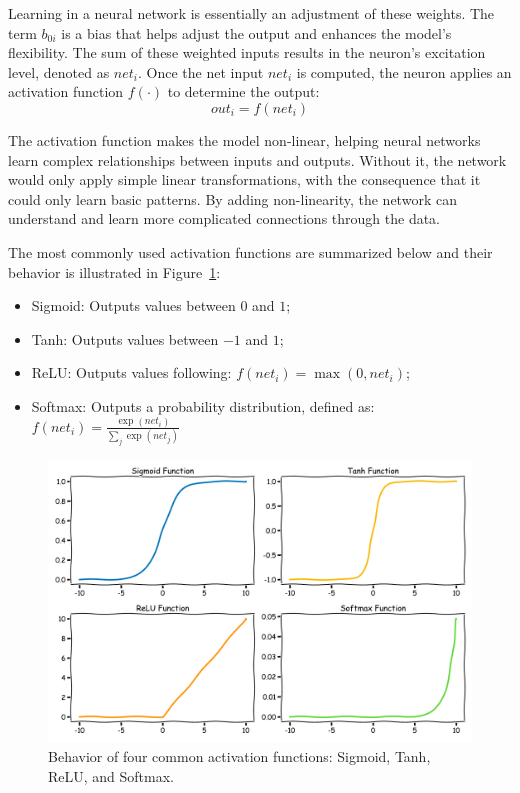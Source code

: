 Learning in a neural network is essentially an adjustment of these weights. The term $b_{0i}$ is a bias that helps adjust the output and enhances the model's flexibility. The sum of these weighted inputs results in the neuron’s excitation level, denoted as $\textit{net}_i$.
Once the net input ${net}_i$ is computed, the neuron applies an activation function $f(\cdot)$ to determine the output:
\begin{equation}
    \textit{out}_i = f(\textit{net}_i)
\end{equation}

The activation function makes the model non-linear, helping neural networks learn complex relationships between inputs and outputs. Without it, the network would only apply simple linear transformations, with the consequence that it could only learn basic patterns. By adding non-linearity, the network can understand and learn more complicated connections through the data.

The most commonly used activation functions are summarized below and their behavior is illustrated in Figure~\ref{fig:activation-functions}:
\begin{itemize}
    \item Sigmoid: Outputs values between $0$ and $1$;
    \item Tanh: Outputs values between $-1$ and $1$;
    \item ReLU: Outputs values following: $f(\textit{net}_i) = \max(0, \textit{net}_i)$;
    \item Softmax: Outputs a probability distribution, defined as: $f(\textit{net}_i) = \frac{\exp(\textit{net}_i)}{\sum_{j} \exp(\textit{net}_j)}$
\end{itemize}
\begin{figure}[H]
    \centering
    \includegraphics[width=1\linewidth]{LateX//figs/activation_functions_xkcd.pdf}
    \caption{Behavior of four common activation functions: Sigmoid, Tanh, ReLU, and Softmax.}
    \label{fig:activation-functions}
\end{figure}

